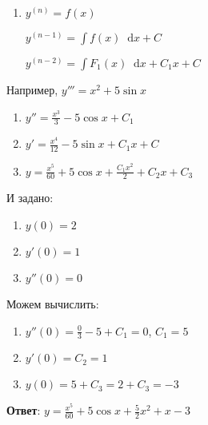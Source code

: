 \documentclass{article}
\newcommand*\diff{\mathop{}\!\mathrm{d}}
\begin{document}
\begin{enumerate}
    \item $y^{(n)} = f(x)$

    $y^{(n - 1)} = \int f(x) \diff x + C$

    $y^{(n - 2)} = \int F_1(x) \diff x + C_1 x + C$
\end{enumerate}

Например, $y''' = x^2 + 5 \sin x$

\begin{enumerate}
    \item $y'' = \frac{x^3}{3} - 5\cos x + C_1$
    \item $y' = \frac{x^4}{12} - 5 \sin x + C_1 x + C$
    \item $y = \frac{x^5}{60} + 5 \cos x + \frac{C_1 x^2}{2} + C_2 x + C_3$
\end{enumerate}

И задано:

\begin{enumerate}
    \item $y(0) = 2$
    \item $y'(0) = 1$
    \item $y''(0) = 0$
\end{enumerate}

Можем вычислить:

\begin{enumerate}
    \item $y''(0) = \frac{0}{3} - 5 + C_1 = 0$, $C_1 = 5$
    \item $y'(0) = C_2 = 1$
    \item $y(0) = 5 + C_3 = 2 + C_3 = -3$
\end{enumerate}

\textbf{Ответ}: $y = \frac{x^5}{60} + 5 \cos x + \frac{5}{2} x^2 + x - 3$
\end{document}
